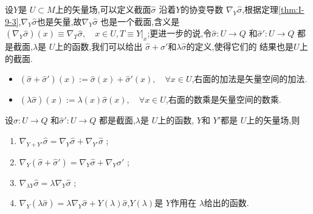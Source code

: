\documentclass[../main.tex]{subfiles}
\begin{document}
设$Y$是 $U \subset M$上的矢量场,可以定义截面$\hat{\sigma}$ 沿着$Y$的协变导数 $\nabla_Y \hat{\sigma}$,根据定理\ref{thm:I-9-3},$\nabla_Y \hat{\sigma}$也是矢量,故$\nabla_Y \hat{\sigma}$
也是一个截面,含义是$(\nabla_Y \hat{\sigma})(x) \equiv \nabla_T \hat{\sigma}, \quad x \in U, T \equiv Y|_x$;更进一步的说,令$\hat{\sigma}: U\to Q$ 和$\hat{\sigma}': U\to Q$ 都是截面,$\lambda$是 $U$上的函数,我们可以给出 $\hat{\sigma} + \hat{\sigma}'$和$\lambda \hat{\sigma}$的定义,使得它们的
结果也是$U$上的截面.
 \begin{itemize}
   \item $(\hat{\sigma} + \hat{\sigma}')(x) := \hat{\sigma}(x) + \hat{\sigma}'(x),\quad \forall x \in U$,右面的加法是矢量空间的加法.
   \item $\left( \lambda \hat{\sigma} \right)(x) := \lambda(x) \hat{\sigma}(x), \quad \forall x \in  U$,右面的数乘是矢量空间的数乘.
\end{itemize}
\begin{theorem}
 设$\hat{\sigma}: U\to Q$ 和$\hat{\sigma}': U\to Q$ 都是截面,$\lambda$是 $U$上的函数, $Y$和 $Y'$都是 $U$上的矢量场,则
 \begin{enumerate}
   \item $\nabla_{Y+Y'} \hat{\sigma} = \nabla_Y \hat{\sigma} + \nabla_{Y'} \hat{\sigma}$ ;
   \item $\nabla _Y(\hat{\sigma} + \hat{\sigma}') = \nabla_Y \hat{\sigma} + \nabla_Y \hat{\sigma}'$ ;
   \item $\nabla _{\lambda Y} \hat{\sigma} = \lambda\nabla_Y \hat{\sigma} $ ;
   \item $\nabla_Y(\lambda \hat{\sigma}) = \lambda \nabla_Y \hat{\sigma} + Y(\lambda) \hat{\sigma}$,$Y(\lambda)$是 $Y$作用在 $\lambda$给出的函数.
 \end{enumerate}
\end{theorem}
\end{document}
